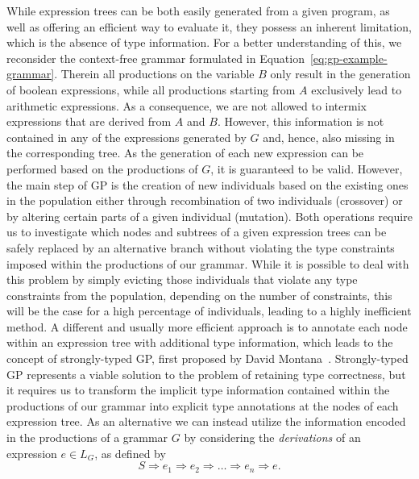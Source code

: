 While expression trees can be both easily generated from a given program, as well as offering an efficient way to evaluate it, they possess an inherent limitation, which is the absence of type information.
For a better understanding of this, we reconsider the context-free grammar formulated in Equation~\eqref{eq:gp-example-grammar}.
Therein all productions on the variable $B$ only result in the generation of boolean expressions, while all productions starting from $A$ exclusively lead to arithmetic expressions.
As a consequence, we are not allowed to intermix expressions that are derived from $A$ and $B$.
However, this information is not contained in any of the expressions generated by $G$ and, hence, also missing in the corresponding tree.
As the generation of each new expression can be performed based on the productions of $G$, it is guaranteed to be valid.
However, the main step of GP is the creation of new individuals based on the existing ones in the population either through recombination of two individuals (crossover) or by altering certain parts of a given individual (mutation). 
Both operations require us to investigate which nodes and subtrees of a given expression trees can be safely replaced by an alternative branch without violating the type constraints imposed within the productions of our grammar.
While it is possible to deal with this problem by simply evicting those individuals that violate any type constraints from the population, depending on the number of constraints, this will be the case for a high percentage of individuals, leading to a highly inefficient method.
A different and usually more efficient approach is to annotate each node within an expression tree with additional type information, which leads to the concept of strongly-typed GP, first proposed by David Montana~\cite{montana1995strongly}.
Strongly-typed GP represents a viable solution to the problem of retaining type correctness, but it requires us to transform the implicit type information contained within the productions of our grammar into explicit type annotations at the nodes of each expression tree.
As an alternative we can instead utilize the information encoded in the productions of a grammar $G$ by considering the \emph{derivations} of an expression $e \in L_G$, as defined by
\begin{equation}
	S \Rightarrow e_1 \Rightarrow e_2 \Rightarrow \dots \Rightarrow e_n \Rightarrow e.
\end{equation}
